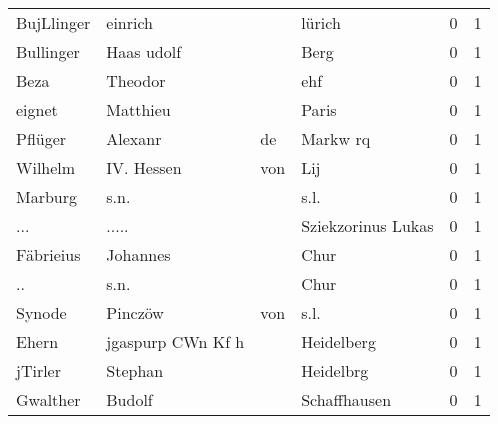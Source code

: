 \begin{center}
\begin{tiny}
\begin{longtabu}{llllrr}
               BujLlinger &                            einrich &             &                                      lürich &          0 &         1 \\
                Bullinger &                         Haas udolf &             &                                        Berg &          0 &         1 \\
                     Beza &                            Theodor &             &                                         ehf &          0 &         1 \\
                   eignet &                           Matthieu &             &                                       Paris &          0 &         1 \\
                  Pflüger &                            Alexanr &          de &                                    Markw rq &          0 &         1 \\
                  Wilhelm &                        IV.  Hessen &         von &                                         Lij &          0 &         1 \\
                  Marburg &                               s.n. &             &                                        s.l. &          0 &         1 \\
                      ... &                              ..... &             &                          Sziekzorinus Lukas &          0 &         1 \\
                Fäbrieius &                           Johannes &             &                                        Chur &          0 &         1 \\
                       .. &                               s.n. &             &                                        Chur &          0 &         1 \\
                   Synode &                            Pinczöw &         von &                                        s.l. &          0 &         1 \\
                    Ehern &                  jgaspurp CWn Kf h &             &                                  Heidelberg &          0 &         1 \\
                  jTirler &                            Stephan &             &                                   Heidelbrg &          0 &         1 \\
                 Gwalther &                             Budolf &             &                                Schaffhausen &          0 &         1 \\

\end{longtabu}
\end{tiny}
\end{center}
